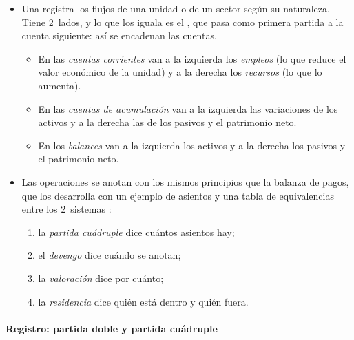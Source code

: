 \documentclass[11pt]{article}
\begin{document}
\begin{itemize}
\item Una  registra los flujos de una unidad o de un sector según su naturaleza. Tiene 2~lados, y lo que los iguala es el , que pasa como primera partida a la cuenta siguiente: así se encadenan las cuentas.
  \begin{itemize}
  \item En las \emph{cuentas corrientes} van a la izquierda los \emph{empleos} (lo que reduce el valor económico de la unidad) y a la derecha los \emph{recursos} (lo que lo aumenta).
  \item En las \emph{cuentas de acumulación} van a la izquierda las variaciones de los activos y a la derecha las de los pasivos y el patrimonio neto.
  \item En los \emph{balances} van a la izquierda los activos y a la derecha los pasivos y el patrimonio neto.
  \end{itemize}
\item Las operaciones se anotan con los mismos principios que la balanza de pagos, que los desarrolla con un ejemplo de asientos y una tabla de equivalencias entre los 2~sistemas :
  \begin{enumerate}
  \item la \emph{partida cuádruple} dice cuántos asientos hay;
  \item el \emph{devengo} dice cuándo se anotan;
  \item la \emph{valoración} dice por cuánto;
  \item la \emph{residencia} dice quién está dentro y quién fuera.
  \end{enumerate}
\end{itemize}

\paragraph{Registro: partida doble y partida cuádruple}
\end{document}
